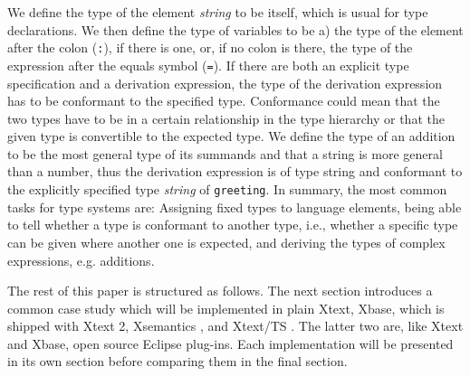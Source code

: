 We define the type of the element \emph{string} to be itself, which is usual for
type declarations. We then define the type of variables to be a) the type of the
element after the colon (\verb|:|), if there is one, or, if no colon is there,
the type of the expression after the equals symbol (\verb|=|).
If there are both an explicit type specification and a derivation expression,
the type of the derivation expression has to be conformant to the specified
type. Conformance could mean that the two types have to be in a certain
relationship in the type hierarchy or that the given type is convertible to the
expected type. We define the type of an addition to be the most general type of
its summands and that a string is more general than a number, thus the
derivation expression is of type string and conformant to the explicitly
specified type \emph{string} of \verb|greeting|. In summary, the most common
tasks for type systems are:
Assigning fixed types to language elements, being able to tell whether a
type is conformant to another type, i.e., whether a specific type can be given
where another one is expected, and deriving the types of complex expressions, e.g.
additions.

The rest of this paper is structured as follows. The next section introduces a
common case study which will be implemented in plain Xtext, Xbase, which is
shipped with Xtext 2, Xsemantics \cite{lbts}, and Xtext/TS \cite{mvts}. The
latter two are, like Xtext and Xbase, open source Eclipse plug-ins. Each
implementation will be presented in its own section before comparing them in
the final section.

